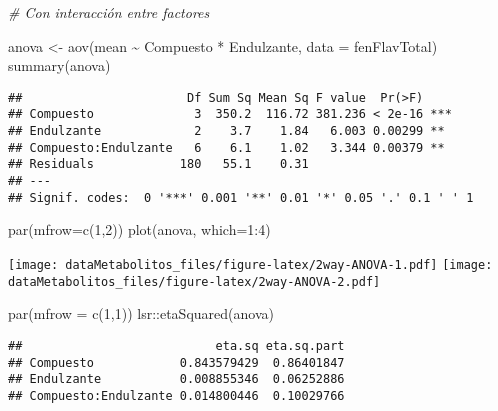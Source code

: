 \documentclass[
]{article}
\newenvironment{Shaded}{\begin{snugshade}}{\end{snugshade}}
\newcommand{\AttributeTok}[1]{\textcolor[rgb]{0.77,0.63,0.00}{#1}}
\newcommand{\CommentTok}[1]{\textcolor[rgb]{0.56,0.35,0.01}{\textit{#1}}}
\newcommand{\DecValTok}[1]{\textcolor[rgb]{0.00,0.00,0.81}{#1}}
\newcommand{\FunctionTok}[1]{\textcolor[rgb]{0.00,0.00,0.00}{#1}}
\newcommand{\NormalTok}[1]{#1}
\newcommand{\OtherTok}[1]{\textcolor[rgb]{0.56,0.35,0.01}{#1}}
\newcommand{\SpecialCharTok}[1]{\textcolor[rgb]{0.00,0.00,0.00}{#1}}
\begin{document}
\begin{Shaded}
\begin{Highlighting}[]
\CommentTok{\# Con interacción entre factores}

\NormalTok{anova }\OtherTok{\textless{}{-}} \FunctionTok{aov}\NormalTok{(mean }\SpecialCharTok{\textasciitilde{}}\NormalTok{ Compuesto }\SpecialCharTok{*}\NormalTok{ Endulzante, }\AttributeTok{data =}\NormalTok{ fenFlavTotal)}
\FunctionTok{summary}\NormalTok{(anova)}
\end{Highlighting}
\end{Shaded}

\begin{verbatim}
##                       Df Sum Sq Mean Sq F value  Pr(>F)    
## Compuesto              3  350.2  116.72 381.236 < 2e-16 ***
## Endulzante             2    3.7    1.84   6.003 0.00299 ** 
## Compuesto:Endulzante   6    6.1    1.02   3.344 0.00379 ** 
## Residuals            180   55.1    0.31                    
## ---
## Signif. codes:  0 '***' 0.001 '**' 0.01 '*' 0.05 '.' 0.1 ' ' 1
\end{verbatim}

\begin{Shaded}
\begin{Highlighting}[]
\FunctionTok{par}\NormalTok{(}\AttributeTok{mfrow=}\FunctionTok{c}\NormalTok{(}\DecValTok{1}\NormalTok{,}\DecValTok{2}\NormalTok{))}
\FunctionTok{plot}\NormalTok{(anova, }\AttributeTok{which=}\DecValTok{1}\SpecialCharTok{:}\DecValTok{4}\NormalTok{)}
\end{Highlighting}
\end{Shaded}

\texttt{[image: dataMetabolitos\_files/figure-latex/2way-ANOVA-1.pdf]}
\texttt{[image: dataMetabolitos\_files/figure-latex/2way-ANOVA-2.pdf]}

\begin{Shaded}
\begin{Highlighting}[]
\FunctionTok{par}\NormalTok{(}\AttributeTok{mfrow =} \FunctionTok{c}\NormalTok{(}\DecValTok{1}\NormalTok{,}\DecValTok{1}\NormalTok{))}
\NormalTok{lsr}\SpecialCharTok{::}\FunctionTok{etaSquared}\NormalTok{(anova)}
\end{Highlighting}
\end{Shaded}

\begin{verbatim}
##                           eta.sq eta.sq.part
## Compuesto            0.843579429  0.86401847
## Endulzante           0.008855346  0.06252886
## Compuesto:Endulzante 0.014800446  0.10029766
\end{verbatim}
\end{document}

